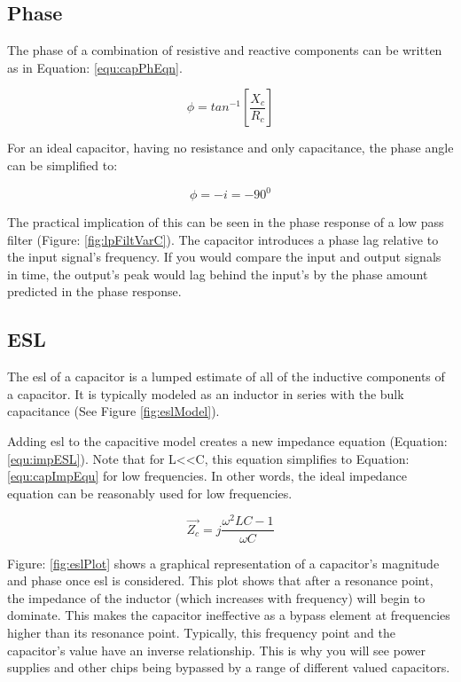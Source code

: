 

\subsection{Phase}

The phase of a combination of resistive and reactive components can be written as in Equation: \eqref{equ:capPhEqn}.

\begin{equation}
\label{equ:capPhEqn}
\phi = tan^{-1}[\frac{X_c}{R_c}]
\end{equation}

For an ideal capacitor, having no resistance and only capacitance, the phase angle can be simplified to:

\begin{equation}
\label{equ:capImpEqu2}
\phi = -i = -90^0
\end{equation}

The practical implication of this can be seen in the phase response of a low pass filter (Figure: \ref{fig:lpFiltVarC}). The capacitor introduces a phase lag relative to the input signal's frequency. If you would compare the input and output signals in time, the output's peak would lag behind the input's by the phase amount predicted in the phase response.


\subsection{ESL}

The \gls{esl} of a capacitor is a lumped estimate of all of the inductive components of a capacitor. It is typically modeled as an inductor in series with the bulk capacitance (See Figure \ref{fig:eslModel}).



Adding \gls{esl} to the capacitive model creates a new impedance equation (Equation: \eqref{equ:impESL}). Note that for L\textless \textless C, this equation simplifies to Equation: \eqref{equ:capImpEqu} for low frequencies. In other words, the ideal impedance equation can be reasonably used for low frequencies.

\begin{equation}
\label{equ:impESL}
\vec{Z_c} = j\frac{\omega ^2LC - 1}{\omega C}
\end{equation}



Figure: \ref{fig:eslPlot} shows a graphical representation of a capacitor's magnitude and phase once \gls{esl} is considered. This plot shows that after a resonance point, the impedance of the inductor (which increases with frequency) will begin to dominate. This makes the capacitor ineffective as a bypass element at frequencies higher than its resonance point. Typically, this frequency point and the capacitor's value have an inverse relationship. This is why you will see power supplies and other chips being bypassed by a range of different valued capacitors. 

